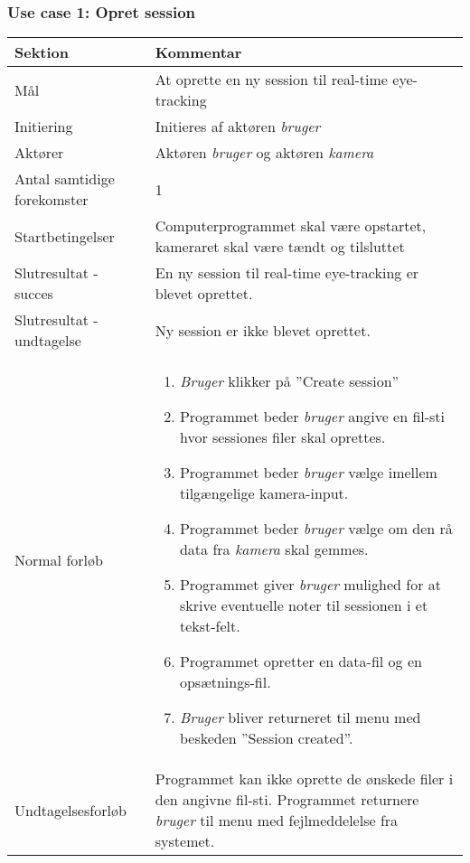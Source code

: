 \documentclass[kravspec.tex]{subfiles}
\begin{document}
		\subsubsection{Use case 1: Opret session}
		\begin{tabular}{|l|p{7.7cm}|}
			\hline \textbf{Sektion} & \textbf{Kommentar} \\ 
			\hline Mål & At oprette en ny session til real-time eye-tracking \\ 
			\hline Initiering & Initieres af aktøren \textit{bruger} \\ 
			\hline Aktører & Aktøren \textit{bruger} og aktøren \textit{kamera}\\ 
			\hline Antal samtidige forekomster & 1 \\ 
			\hline Startbetingelser & Computerprogrammet skal være opstartet, kameraret skal være tændt og tilsluttet \\ 	
			\hline Slutresultat - succes & En ny session til real-time eye-tracking er blevet oprettet. \\ 
			\hline Slutresultat - undtagelse &  Ny session er ikke blevet oprettet. \\ 
			\hline Normal forløb & \begin{enumerate}
				\item \textit{Bruger} klikker på ”Create session”
				\item Programmet beder \textit{bruger} angive en fil-sti hvor sessiones filer skal oprettes.
				\item Programmet beder \textit{bruger} vælge imellem tilgængelige kamera-input.
				\item Programmet beder \textit{bruger} vælge om den rå data fra \textit{kamera} skal gemmes.
				
				
				\item Programmet giver \textit{bruger} mulighed for at skrive eventuelle noter til sessionen i et tekst-felt. 
				\item Programmet opretter en data-fil og en opsætnings-fil.
				\item \textit{Bruger} bliver returneret til menu med beskeden ”Session created”.
				
			\end{enumerate} \\ 
			\hline Undtagelsesforløb & Programmet kan ikke oprette de ønskede filer i den angivne fil-sti. Programmet returnere \textit{bruger} til menu med fejlmeddelelse fra systemet.  \\ 
			\hline 
		\end{tabular} \\ \\
		
\end{document}
